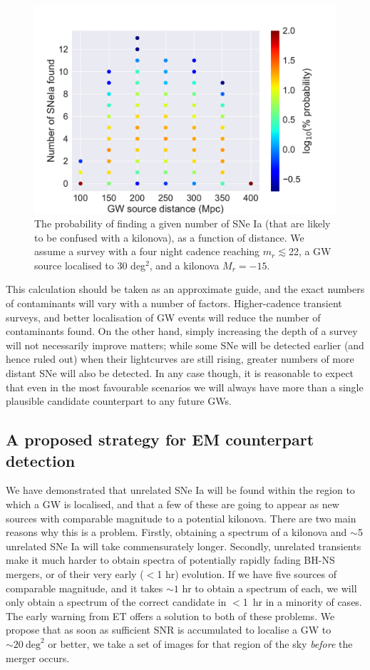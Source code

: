 \documentclass{aa}
\begin{document}
\begin{figure}[h]
\includegraphics[width=\linewidth]{../Figs/SNIa_lim22mag_v2}
\caption{The probability of finding a given number of SNe Ia (that are likely to be confused with a kilonova), as a function of distance. We assume a survey with a four night cadence reaching $m_r\lesssim$22, a GW source localised to 30 deg$^2$, and a kilonova  $M_r=-15$.}
\label{fig:SNIa}
\end{figure}

This calculation should be taken as an approximate guide, and the exact numbers of contaminants will vary with a number of factors. Higher-cadence transient surveys, and better localisation of GW events will reduce the number of contaminants found. On the other hand, simply increasing the depth of a survey will not necessarily improve matters; while some SNe will be detected earlier (and hence ruled out) when their lightcurves are still rising, greater numbers of more distant SNe will also be detected. In any case though, it is reasonable to expect that even in the most favourable scenarios we will always have more than a single plausible candidate counterpart to any future GWs.

\subsection{A proposed strategy for EM counterpart detection}

We have demonstrated that unrelated SNe Ia will be found within the region to which a GW is localised, and that a few of these are going to appear as new sources with comparable magnitude to a potential kilonova. There are two main reasons why this is a problem. Firstly, obtaining a spectrum of a kilonova and $\sim$5 unrelated SNe Ia will take commensurately longer.
Secondly, unrelated transients make it much harder to obtain spectra of potentially rapidly fading BH-NS mergers, or of their very early ($<$1 hr) evolution. If we have five sources of comparable magnitude, and it takes $\sim1$ hr to obtain a spectrum of each, we will only obtain a spectrum of the correct candidate in $<$1~hr in a minority of cases.
The early warning from ET offers a solution to both of these problems. We propose that as soon as sufficient SNR is accumulated to localise a GW to $\sim20~\mathrm{deg}^2$ or better, we take a set of images for that region of the sky {\it before} the merger occurs.
\end{document}
